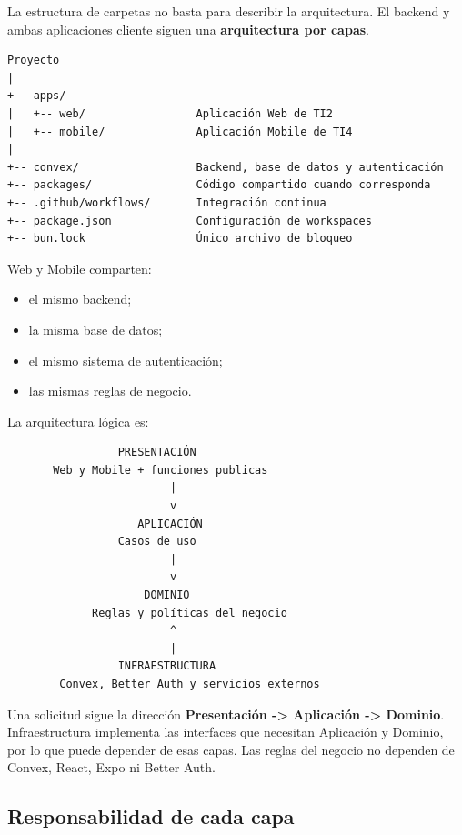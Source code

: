 \documentclass[11pt,a4paper]{article}
\begin{document}
La estructura de carpetas no basta para describir la arquitectura. El backend y
ambas aplicaciones cliente siguen una \textbf{arquitectura por capas}.

\begin{lstlisting}
Proyecto
|
+-- apps/
|   +-- web/                 Aplicación Web de TI2
|   +-- mobile/              Aplicación Mobile de TI4
|
+-- convex/                  Backend, base de datos y autenticación
+-- packages/                Código compartido cuando corresponda
+-- .github/workflows/       Integración continua
+-- package.json             Configuración de workspaces
+-- bun.lock                 Único archivo de bloqueo
\end{lstlisting}

Web y Mobile comparten:

\begin{itemize}
  \item el mismo backend;
  \item la misma base de datos;
  \item el mismo sistema de autenticación;
  \item las mismas reglas de negocio.
\end{itemize}

La arquitectura lógica es:

\begin{lstlisting}
                 PRESENTACIÓN
       Web y Mobile + funciones publicas
                         |
                         v
                    APLICACIÓN
                 Casos de uso
                         |
                         v
                     DOMINIO
             Reglas y políticas del negocio
                         ^
                         |
                 INFRAESTRUCTURA
        Convex, Better Auth y servicios externos
\end{lstlisting}

Una solicitud sigue la dirección \textbf{Presentación -> Aplicación ->
Dominio}. Infraestructura implementa las interfaces que necesitan Aplicación y
Dominio, por lo que puede depender de esas capas. Las reglas del negocio no
dependen de Convex, React, Expo ni Better Auth.

\subsection{Responsabilidad de cada capa}
\end{document}
